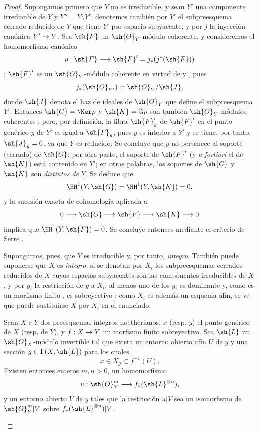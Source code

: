 \documentclass[oneside,10pt]{amsart}
\makeatletter
\newcommand{\ega@arrow}[2]{\mathchoice{#1}{#2}{#2}{#2}}
\renewcommand{\to}{\ega@arrow{\longrightarrow}{\rightarrow}}
\newcommand{\oldpage}[2][]{\marginnote{\normalfont\footnotesize\textbf{#1}~|~#2}\ignorespaces}
\let\EGAOriginalLabel\label
\renewcommand{\label}[1]{\phantomsection\EGAOriginalLabel{#1}}
\makeatother
\begin{document}
\begin{proof}
Supongamos primero que $Y$ no es irreducible, y sean $Y'$ una componente irreducible de $Y$ y $Y''=Y\setminus Y'$;
denotemos también por $Y'$ el subpreesquema cerrado reducido de $Y$ que tiene $Y'$ por espacio subyacente, y por $j$ la inyección canónica $Y'\to Y$.
Sea $\sh{F}$ un $\sh{O}_Y$-módulo coherente, y consideremos el homomorfismo canónico
\[
  \rho:\sh{F}\to\sh{F}'=j_*(j^*(\sh{F}))
\]
;
$\sh{F}'$ es un $\sh{O}_Y$-módulo coherente en virtud de  y , pues
\[
  j_*(\sh{O}_{Y'})=\sh{O}_Y/\sh{J},
\]
donde $\sh{J}$ denota el haz de ideales de $\sh{O}_Y$ que define el subpreesquema $Y'$.
Entonces $\sh{G}=\Ker\rho$ y $\sh{K}=\Im\rho$ son también $\sh{O}_Y$-módulos coherentes ;
pero, por definición, la fibra $\sh{F}'_y$ de $\sh{F}'$ en el punto genérico $y$ de $Y'$ es igual a $\sh{F}_y$, pues $y$ es interior a $Y'$ y se tiene, por tanto, $\sh{J}_y=0$, ya que $Y$ es reducido.
Se concluye que $y$ no pertenece al soporte (cerrado) de $\sh{G}$;
por otra parte, el soporte de $\sh{F}'$ (y \emph{a fortiori} el de $\sh{K}$) está contenido en $Y'$;
en otras palabras, los soportes de $\sh{G}$ y $\sh{K}$ son \emph{distintos de $Y$}.
Se deduce que
\[
  \HH^1(Y,\sh{G})=\HH^1(Y,\sh{K})=0,
\]
y la sucesión exacta de cohomología aplicada a
\[
  0\to\sh{G}\to\sh{F}\to\sh{K}\to0
\]
implica que $\HH^1(Y,\sh{F})=0$.
Se concluye entonces mediante el criterio de Serre .

Supongamos, pues, que $Y$ es irreducible y, por tanto, \emph{íntegro}.
También puede suponerse que $X$ es \emph{íntegro}:
si se denotan por $X_i$ los subpreesquemas cerrados reducidos de $X$ cuyos espacios subyacentes son las componentes irreducibles de $X$ , y por $g_i$ la restricción de $g$ a $X_i$, al menos uno de los $g_i$ es dominante y, como es un morfismo finito , es sobreyectivo ;
como $X_i$ es además un esquema afín, se ve que puede sustituirse $X$ por $X_i$ en el enunciado.

\begin{lemma}[6.7.1.1]
\label{II.6.7.1.1}
Sean $X$ e $Y$ dos preesquemas íntegros noetherianos, $x$ \textup{(resp. $y$)} el punto genérico de $X$ \textup{(resp. de $Y$)}, y $f:X\to Y$ un morfismo finito sobreyectivo.
Sea $\sh{L}$ un $\sh{O}_X$-módulo invertible tal que exista un entorno abierto afín $U$ de $y$ y una sección $g\in\Gamma(X,\sh{L})$ para los cuales
\[
  x\in X_g\subset f^{-1}(U).
\]
\oldpage[II]{137}
Existen entonces enteros $m,n>0$, un homomorfismo
\[
  u:\sh{O}_Y^m\to f_*(\sh{L}^{\otimes n}),
\]
y un entorno abierto $V$ de $y$ tales que la restricción $u|V$ sea un isomorfismo de $\sh{O}_Y^m|V$ sobre $f_*(\sh{L}^{\otimes n})|V$.
\end{lemma}


\end{proof}
\end{document}
